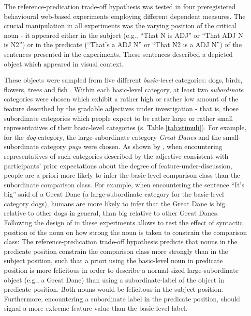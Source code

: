 The reference-predication trade-off hypothesis was tested in four preregistered behavioural web-based experiments employing different dependent measures. The crucial manipulation in all experiments was the varying position of the critical noun - it appeared either in the subject (e.g., “That N is ADJ” or “That ADJ N is N2”) or in the predicate (“That’s a ADJ N” or “That N2 is a ADJ N”) of the sentences presented in the experiments. These sentences described a depicted object which appeared in visual context. 

These objects were sampled from five different \textit{basic-level} categories: dogs, birds, flowers, trees and fish \parencite{rosch1976}. Within each basic-level category, at least two \textit{subordinate} categories were chosen which exhibit a rather high or rather low amount of the feature described by the gradable adjectives under investigation - that is, those subordinate categories which people expect to be rather large or rather small representatives of their basic-level categories (s. Table \ref{tab:stimuli}). For example, for the \textit{dog}-category, the large-subordinate category \textit{Great Danes} and the small-subordinate category \textit{pugs} were chosen. As shown by \textcite{tessler2017warm}, when encountering representatives of such categories described by the adjective consistent with participants’ prior expectations about the degree of feature-under-discussion, people are a priori more likely to infer the basic-level comparison class than the subordinate comparison class. For example, when encountering the sentence “It’s big” said of a Great Dane (a large-subordinate category for the basic-level category dogs), humans are more likely to infer that the Great Dane is big relative to other dogs in general, than big relative to other Great Danes.  
Following the design of \textcite{tessler2017warm} in these experiments allows to test the effect of syntactic position of the noun on how strong the noun is taken to constrain the comparison class: The reference-predication trade-off hypothesis predicts that nouns in the predicate position constrain the comparison class more strongly than in the subject position, such that a priori using the basic-level noun in predicate position is more felicitous in order to describe a normal-sized large-subordinate object (e.g., a Great Dane) than using a subordinate-label of the object in predicate position. Both nouns would be felicitous in the subject position. Furthermore, encountering a subordinate label in the predicate position, should signal a more extreme feature value than the basic-level label.

